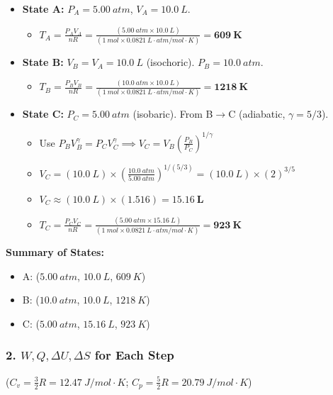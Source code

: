 \documentclass[article]{article}
\begin{document}
\begin{itemize}
    \item \textbf{State A:} $P_A = \SI{5.00}{atm}$, $V_A = \SI{10.0}{L}$.
        \begin{itemize}
            \item $T_A = \frac{P_A V_A}{nR} = \frac{(\SI{5.00}{atm} \times \SI{10.0}{L})}{(\SI{1}{mol} \times \SI{0.0821}{L\cdot atm/mol\cdot K})} = \mathbf{\SI{609}{K}}$
        \end{itemize}
    
    \item \textbf{State B:} $V_B = V_A = \SI{10.0}{L}$ (isochoric). $P_B = \SI{10.0}{atm}$.
        \begin{itemize}
            \item $T_B = \frac{P_B V_B}{nR} = \frac{(\SI{10.0}{atm} \times \SI{10.0}{L})}{(\SI{1}{mol} \times \SI{0.0821}{L\cdot atm/mol\cdot K})} = \mathbf{\SI{1218}{K}}$
        \end{itemize}
        
    \item \textbf{State C:} $P_C = \SI{5.00}{atm}$ (isobaric). From B$\to$C (adiabatic, $\gamma=5/3$).
    \begin{itemize}
        \item Use $P_B V_B^\gamma = P_C V_C^\gamma \implies V_C = V_B \left(\frac{P_B}{P_C}\right)^{1/\gamma}$
        \item $V_C = (\SI{10.0}{L}) \times \left(\frac{\SI{10.0}{atm}}{\SI{5.00}{atm}}\right)^{1 / (5/3)} = (\SI{10.0}{L}) \times (2)^{3/5}$
        \item $V_C \approx (\SI{10.0}{L}) \times (1.516) = \mathbf{\SI{15.16}{L}}$
        \item $T_C = \frac{P_C V_C}{nR} = \frac{(\SI{5.00}{atm} \times \SI{15.16}{L})}{(\SI{1}{mol} \times \SI{0.0821}{L\cdot atm/mol\cdot K})} = \mathbf{\SI{923}{K}}$
    \end{itemize}
\end{itemize}
\textbf{Summary of States:}
\begin{itemize}
    \item A: ($\SI{5.00}{atm}$, $\SI{10.0}{L}$, $\SI{609}{K}$)
    \item B: ($\SI{10.0}{atm}$, $\SI{10.0}{L}$, $\SI{1218}{K}$)
    \item C: ($\SI{5.00}{atm}$, $\SI{15.16}{L}$, $\SI{923}{K}$)
\end{itemize}

\subsubsection{2. $W, Q, \Delta U, \Delta S$ for Each Step}
($C_v = \frac{3}{2}R = \SI{12.47}{J/mol\cdot K}$; $C_p = \frac{5}{2}R = \SI{20.79}{J/mol\cdot K}$)
\end{document}
